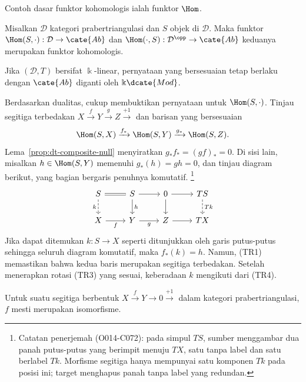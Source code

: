 Contoh dasar funktor kohomologis ialah funktor $\Hom$.

\begin{proposisi}\label{prop:cohomological-Hom-functor}
	Misalkan $\mathcal{D}$ kategori prabertriangulasi dan $S$ objek di
	$\mathcal{D}$. Maka funktor
	$\Hom(S, \cdot): \mathcal{D} \to \cate{Ab}$ dan
	$\Hom(\cdot, S): \mathcal{D}^{\opp} \to \cate{Ab}$ keduanya merupakan
	funktor kohomologis.

	Jika $(\mathcal{D}, T)$ bersifat $\Bbbk$-linear, pernyataan yang
	bersesuaian tetap berlaku dengan $\cate{Ab}$ diganti oleh
	$\Bbbk\dcate{Mod}$.
\end{proposisi}

\begin{bukti}
	Berdasarkan dualitas, cukup membuktikan pernyataan untuk
	$\Hom(S, \cdot)$. Tinjau segitiga
	terbedakan $X \xrightarrow{f} Y \xrightarrow{g} Z \xrightarrow{+1}$ dan
	barisan yang bersesuaian
	\[ \Hom(S, X) \xrightarrow{f_*} \Hom(S, Y) \xrightarrow{g_*} \Hom(S, Z). \]
	Lema~\ref{prop:dt-composite-null} menyiratkan
	$g_* f_* = (gf)_* = 0$. Di sisi lain, misalkan
	$h \in \Hom(S, Y)$ memenuhi $g_*(h) = gh = 0$, dan tinjau diagram berikut,
	yang bagian bergaris penuhnya komutatif.%
	\footnote{Catatan penerjemah (O014-C072): pada simpul $TS$, sumber
	menggambar dua panah putus-putus yang berimpit menuju $TX$, satu tanpa label
	dan satu berlabel $Tk$. Morfisme segitiga hanya mempunyai satu komponen
	$Tk$ pada posisi ini; target menghapus panah tanpa label yang redundan.}
	\[\begin{tikzcd}
		S \arrow[dashed, d, "k"'] \arrow[equal, r] & S \arrow[d, "h"] \arrow[r] & 0 \arrow[d] \arrow[r] & TS \arrow[dashed, d, "Tk"] \\
		X \arrow[r, "f"'] & Y \arrow[r, "g"'] & Z \arrow[r] & TX
	\end{tikzcd}\]
	Jika dapat ditemukan $k: S \to X$ seperti ditunjukkan oleh garis
	putus-putus sehingga seluruh diagram komutatif, maka $f_*(k) = h$. Namun,
	(TR1) memastikan bahwa kedua baris merupakan segitiga terbedakan. Setelah
	menerapkan rotasi (TR3) yang sesuai, keberadaan $k$ mengikuti dari (TR4).
\end{bukti}

\begin{korolari}\label{prop:triangle-0-isom}
	Untuk suatu segitiga berbentuk
	$X \xrightarrow{f} Y \to 0 \xrightarrow{+1}$ dalam kategori
	prabertriangulasi, $f$ mesti merupakan isomorfisme.
\end{korolari}

